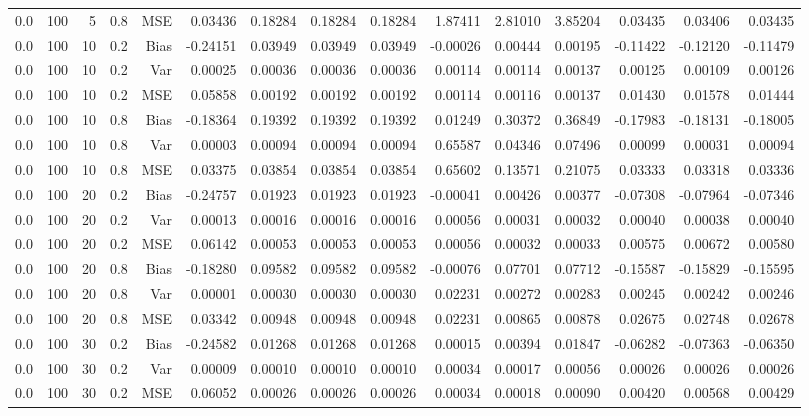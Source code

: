 \begin{table}[!htbp]
\begin{tabular}{lrrrrrrrrrrrrrr}
0.0 & 100 &  5 & 0.8 & MSE & 0.03436 & 0.18284 & 0.18284 & 0.18284 & 1.87411 & 2.81010 & 3.85204 & 0.03435 & 0.03406 & 0.03435 \\
0.0 & 100 & 10 & 0.2 & Bias & -0.24151 & 0.03949 & 0.03949 & 0.03949 & -0.00026 & 0.00444 & 0.00195 & -0.11422 & -0.12120 & -0.11479 \\
0.0 & 100 & 10 & 0.2 & Var & 0.00025 & 0.00036 & 0.00036 & 0.00036 & 0.00114 & 0.00114 & 0.00137 & 0.00125 & 0.00109 & 0.00126 \\
0.0 & 100 & 10 & 0.2 & MSE & 0.05858 & 0.00192 & 0.00192 & 0.00192 & 0.00114 & 0.00116 & 0.00137 & 0.01430 & 0.01578 & 0.01444 \\
0.0 & 100 & 10 & 0.8 & Bias & -0.18364 & 0.19392 & 0.19392 & 0.19392 & 0.01249 & 0.30372 & 0.36849 & -0.17983 & -0.18131 & -0.18005 \\
0.0 & 100 & 10 & 0.8 & Var & 0.00003 & 0.00094 & 0.00094 & 0.00094 & 0.65587 & 0.04346 & 0.07496 & 0.00099 & 0.00031 & 0.00094 \\
0.0 & 100 & 10 & 0.8 & MSE & 0.03375 & 0.03854 & 0.03854 & 0.03854 & 0.65602 & 0.13571 & 0.21075 & 0.03333 & 0.03318 & 0.03336 \\
0.0 & 100 & 20 & 0.2 & Bias & -0.24757 & 0.01923 & 0.01923 & 0.01923 & -0.00041 & 0.00426 & 0.00377 & -0.07308 & -0.07964 & -0.07346 \\
0.0 & 100 & 20 & 0.2 & Var & 0.00013 & 0.00016 & 0.00016 & 0.00016 & 0.00056 & 0.00031 & 0.00032 & 0.00040 & 0.00038 & 0.00040 \\
0.0 & 100 & 20 & 0.2 & MSE & 0.06142 & 0.00053 & 0.00053 & 0.00053 & 0.00056 & 0.00032 & 0.00033 & 0.00575 & 0.00672 & 0.00580 \\
0.0 & 100 & 20 & 0.8 & Bias & -0.18280 & 0.09582 & 0.09582 & 0.09582 & -0.00076 & 0.07701 & 0.07712 & -0.15587 & -0.15829 & -0.15595 \\
0.0 & 100 & 20 & 0.8 & Var & 0.00001 & 0.00030 & 0.00030 & 0.00030 & 0.02231 & 0.00272 & 0.00283 & 0.00245 & 0.00242 & 0.00246 \\
0.0 & 100 & 20 & 0.8 & MSE & 0.03342 & 0.00948 & 0.00948 & 0.00948 & 0.02231 & 0.00865 & 0.00878 & 0.02675 & 0.02748 & 0.02678 \\
0.0 & 100 & 30 & 0.2 & Bias & -0.24582 & 0.01268 & 0.01268 & 0.01268 & 0.00015 & 0.00394 & 0.01847 & -0.06282 & -0.07363 & -0.06350 \\
0.0 & 100 & 30 & 0.2 & Var & 0.00009 & 0.00010 & 0.00010 & 0.00010 & 0.00034 & 0.00017 & 0.00056 & 0.00026 & 0.00026 & 0.00026 \\
0.0 & 100 & 30 & 0.2 & MSE & 0.06052 & 0.00026 & 0.00026 & 0.00026 & 0.00034 & 0.00018 & 0.00090 & 0.00420 & 0.00568 & 0.00429 \\

\end{tabular}
\end{table}
